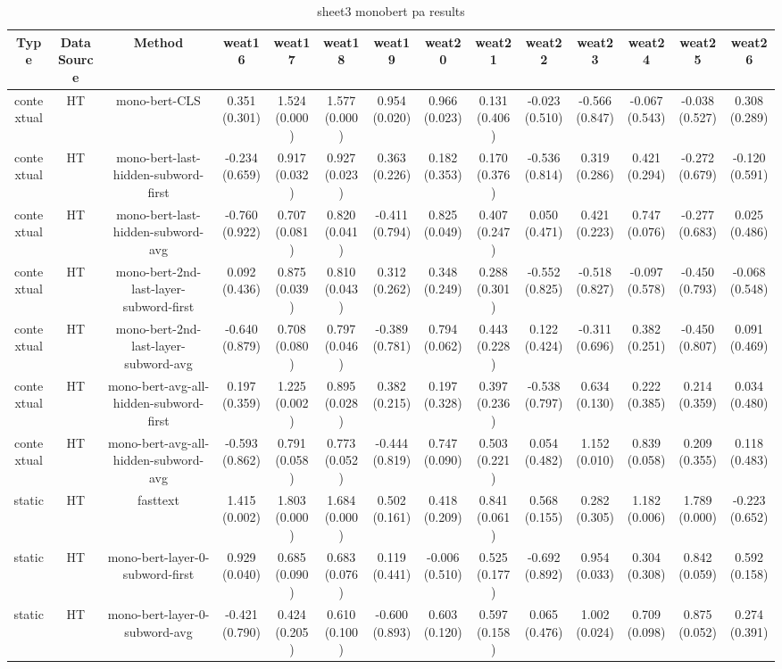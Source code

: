 \begin{sidewaystable}[htb]
    \centering
    \caption{sheet3 monobert pa results}
    \label{appendix_tab:sheet3_monobert_pa_results}
    \small
    \begin{tabular}{@{}cccccccccccccc@{}}
        \toprule
        Type & DataSource & Method & weat16 & weat17 & weat18 & weat19 & weat20 & weat21 & weat22 & weat23 & weat24 & weat25 & weat26 \\
        \midrule
        contextual & HT & mono-bert-CLS & 0.351 (0.301) & 1.524 (0.000) & 1.577 (0.000) & 0.954 (0.020) & 0.966 (0.023) & 0.131 (0.406) & -0.023 (0.510) & -0.566 (0.847) & -0.067 (0.543) & -0.038 (0.527) & 0.308 (0.289) \\
        contextual & HT & mono-bert-last-hidden-subword-first & -0.234 (0.659) & 0.917 (0.032) & 0.927 (0.023) & 0.363 (0.226) & 0.182 (0.353) & 0.170 (0.376) & -0.536 (0.814) & 0.319 (0.286) & 0.421 (0.294) & -0.272 (0.679) & -0.120 (0.591) \\
        contextual & HT & mono-bert-last-hidden-subword-avg & -0.760 (0.922) & 0.707 (0.081) & 0.820 (0.041) & -0.411 (0.794) & 0.825 (0.049) & 0.407 (0.247) & 0.050 (0.471) & 0.421 (0.223) & 0.747 (0.076) & -0.277 (0.683) & 0.025 (0.486) \\
        contextual & HT & mono-bert-2nd-last-layer-subword-first & 0.092 (0.436) & 0.875 (0.039) & 0.810 (0.043) & 0.312 (0.262) & 0.348 (0.249) & 0.288 (0.301) & -0.552 (0.825) & -0.518 (0.827) & -0.097 (0.578) & -0.450 (0.793) & -0.068 (0.548) \\
        contextual & HT & mono-bert-2nd-last-layer-subword-avg & -0.640 (0.879) & 0.708 (0.080) & 0.797 (0.046) & -0.389 (0.781) & 0.794 (0.062) & 0.443 (0.228) & 0.122 (0.424) & -0.311 (0.696) & 0.382 (0.251) & -0.450 (0.807) & 0.091 (0.469) \\
        contextual & HT & mono-bert-avg-all-hidden-subword-first & 0.197 (0.359) & 1.225 (0.002) & 0.895 (0.028) & 0.382 (0.215) & 0.197 (0.328) & 0.397 (0.236) & -0.538 (0.797) & 0.634 (0.130) & 0.222 (0.385) & 0.214 (0.359) & 0.034 (0.480) \\
        contextual & HT & mono-bert-avg-all-hidden-subword-avg & -0.593 (0.862) & 0.791 (0.058) & 0.773 (0.052) & -0.444 (0.819) & 0.747 (0.090) & 0.503 (0.221) & 0.054 (0.482) & 1.152 (0.010) & 0.839 (0.058) & 0.209 (0.355) & 0.118 (0.483) \\
        static & HT & fasttext & 1.415 (0.002) & 1.803 (0.000) & 1.684 (0.000) & 0.502 (0.161) & 0.418 (0.209) & 0.841 (0.061) & 0.568 (0.155) & 0.282 (0.305) & 1.182 (0.006) & 1.789 (0.000) & -0.223 (0.652) \\
        static & HT & mono-bert-layer-0-subword-first & 0.929 (0.040) & 0.685 (0.090) & 0.683 (0.076) & 0.119 (0.441) & -0.006 (0.510) & 0.525 (0.177) & -0.692 (0.892) & 0.954 (0.033) & 0.304 (0.308) & 0.842 (0.059) & 0.592 (0.158) \\
        static & HT & mono-bert-layer-0-subword-avg & -0.421 (0.790) & 0.424 (0.205) & 0.610 (0.100) & -0.600 (0.893) & 0.603 (0.120) & 0.597 (0.158) & 0.065 (0.476) & 1.002 (0.024) & 0.709 (0.098) & 0.875 (0.052) & 0.274 (0.391) \\
        \bottomrule
    \end{tabular}
\end{sidewaystable}